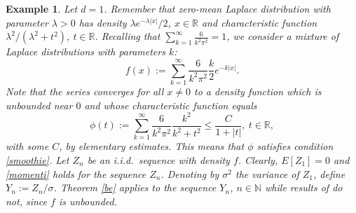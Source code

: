 \documentclass{article}
\newtheorem{remark}[theorem]{Remark}
\newtheorem{example}[theorem]{Example}
\begin{document}

\begin{example}
{\rm Let $d=1$. Remember that zero-mean Laplace distribution with parameter $\lambda>0$ has density 
$\lambda e^{-\lambda |x|}/2$, $x\in\mathbb{R}$ and characteristic function $\lambda^{2}/(\lambda^{2}+t^{2})$, $t\in\mathbb{R}$.
Recalling that $\sum_{k=1}^{\infty}\frac{6}{k^{2}\pi^{2}}=1$, we consider a mixture of Laplace distributions with parameters $k$:
$$
f(x):=\sum_{k=1}^{\infty}\frac{6}{k^{2}\pi^{2}}\frac{k}{2}e^{-k|x|}.
$$
Note that the series converges for all $x\neq 0$ to a density function which is unbounded near $0$ and whose characteristic function equals
$$
\phi(t):=\sum_{k=1}^{\infty}\frac{6}{k^{2}\pi^{2}}\frac{k^{2}}{k^{2}+t^{2}}\leq \frac{C}{1+|t|},\ t\in\mathbb{R},
$$ 
with some $C$, by elementary estimates.
This means that $\phi$ satisfies condition \eqref{smoothie}. 
Let $Z_{n}$ be an i.i.d.\ sequence with density $f$. Clearly, $E[Z_{1}]=0$ and
\eqref{momenti} holds for the sequence $Z_{n}$. Denoting by $\sigma^{2}$ the variance of $Z_{1}$, define $Y_{n}:=Z_{n}/\sigma$.
Theorem \ref{be} applies to the sequence $Y_{n}$, $n\in\mathbb{N}$ while
results of \cite{bobkov-goetze} do not, since $f$ is unbounded.
}	
\end{example}



\end{document}
